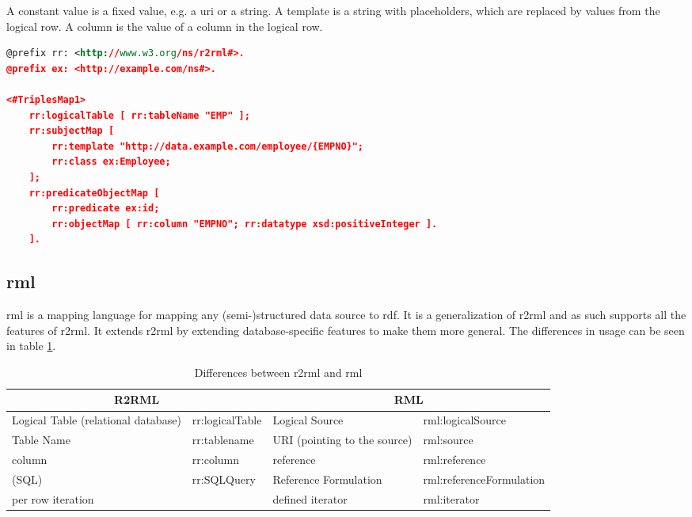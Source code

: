 A constant value is a fixed value, e.g. a \acrshort{uri} or a string. A template is a string with placeholders, which are replaced by values from the logical row. A column is the value of a column in the logical row. 

\begin{lstlisting}[language=XML, caption={Example of an \acrshort{r2rml} mapping}, label={lst:r2rml_mapping}, captionpos=b]
@prefix rr: <http://www.w3.org/ns/r2rml#>.
@prefix ex: <http://example.com/ns#>.

<#TriplesMap1>
    rr:logicalTable [ rr:tableName "EMP" ];
    rr:subjectMap [
        rr:template "http://data.example.com/employee/{EMPNO}";
        rr:class ex:Employee;
    ];
    rr:predicateObjectMap [
        rr:predicate ex:id;
        rr:objectMap [ rr:column "EMPNO"; rr:datatype xsd:positiveInteger ].
    ].
\end{lstlisting}

\subsection{\acrshort{rml}}
\acrfull{rml} is a mapping language for mapping any (semi-)structured data source to \acrshort{rdf}. It is a generalization of \acrshort{r2rml} and as such supports all the features of \acrshort{r2rml}. It extends \acrshort{r2rml} by extending database-specific features to make them more general. The differences in usage can be seen in table \ref{tab:r2rml_rml_differences}. \citep{rml}

\begin{table}[]
    \begin{tabular}{|ll|ll|}
    \hline
    \multicolumn{2}{|c|}{R2RML}                           & \multicolumn{2}{c|}{RML}                                            \\ \hline
    Logical Table (relational database) & rr:logicalTable & Logical Source                           & rml:logicalSource        \\ \hline
    Table Name                          & rr:tablename    & URI (pointing to the source)             & rml:source               \\ \hline
    column                              & rr:column       & reference                                & rml:reference            \\ \hline
    (SQL)                               & rr:SQLQuery     & Reference Formulation                    & rml:referenceFormulation \\ \hline
    per row iteration                   &                 & defined iterator                         & rml:iterator             \\ \hline
    \end{tabular}
    \caption{Differences between \acrshort{r2rml} and \acrshort{rml}}
    \label{tab:r2rml_rml_differences}
\end{table}


